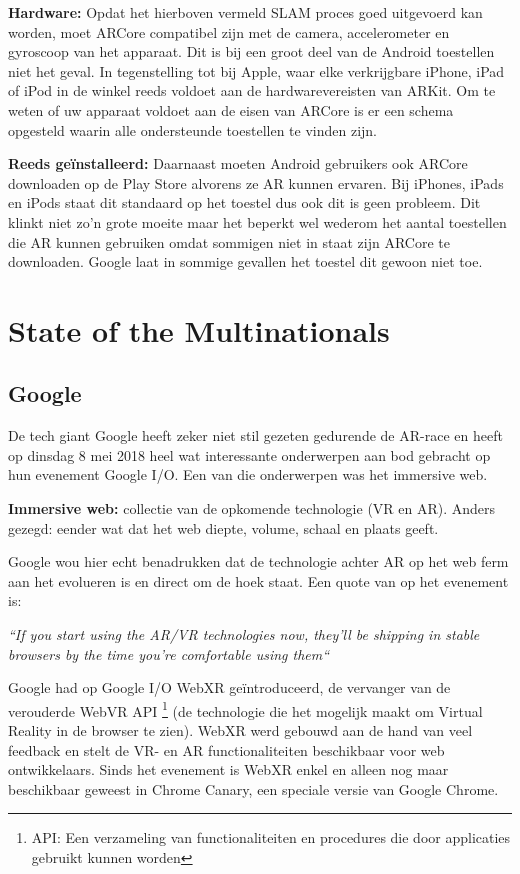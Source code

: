 \textbf{Hardware:}
Opdat het hierboven vermeld SLAM proces goed uitgevoerd kan worden, moet ARCore compatibel zijn met de camera, accelerometer en gyroscoop van het apparaat. Dit is bij een groot deel van de Android toestellen niet het geval. In tegenstelling tot bij Apple, waar elke verkrijgbare iPhone, iPad of iPod in de winkel reeds voldoet aan de hardwarevereisten van ARKit. Om te weten of uw apparaat voldoet aan de eisen van ARCore is er een schema opgesteld waarin alle ondersteunde toestellen te vinden zijn. ~\autocite{GoogleDevices2019}

\textbf{Reeds geïnstalleerd:}
Daarnaast moeten Android gebruikers ook ARCore downloaden op de Play Store alvorens ze AR kunnen ervaren. Bij iPhones, iPads en iPods staat dit standaard op het toestel dus ook dit is geen probleem. Dit klinkt niet zo'n grote moeite maar het beperkt wel wederom het aantal toestellen die AR kunnen gebruiken omdat sommigen niet in staat zijn ARCore te downloaden. Google laat in sommige gevallen het toestel dit gewoon niet toe. 

\section{State of the Multinationals}
\label{sec:state-of-the-multinationals}


\subsection{Google}
De tech giant Google heeft zeker niet stil gezeten gedurende de AR-race en heeft op dinsdag 8 mei 2018 heel wat interessante onderwerpen aan bod gebracht op hun evenement Google I/O. Een van die onderwerpen was het immersive web.

\textbf{Immersive web:} 
collectie van de opkomende technologie (VR en AR). Anders gezegd: eender wat dat het web diepte, volume, schaal en plaats geeft.

Google wou hier echt benadrukken dat de technologie achter AR op het web ferm aan het evolueren is en direct om de hoek staat. Een quote van op het evenement is:

\textit{``If you start using the AR/VR technologies now, they’ll be shipping in stable browsers by the time you’re comfortable using them``}

Google had op Google I/O WebXR geïntroduceerd, de vervanger van de verouderde WebVR API \footnote{API: Een verzameling van functionaliteiten en procedures die door applicaties gebruikt kunnen worden} (de technologie die het mogelijk maakt om Virtual Reality in de browser te zien). WebXR werd gebouwd aan de hand van veel feedback en stelt de VR- en AR functionaliteiten beschikbaar voor web ontwikkelaars. Sinds het evenement is WebXR enkel en alleen nog maar beschikbaar geweest in Chrome Canary, een speciale versie van Google Chrome.

